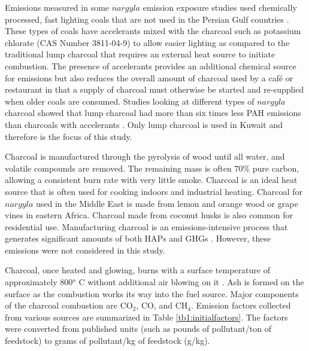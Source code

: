Emissions measured in some $nargyla$ emission exposure studies used chemically processed, fast lighting coals that are not used in the Persian Gulf countries \citep{Daher2010, Shihadeh2005}.  These types of coals have accelerants mixed with the charcoal such as potassium chlorate (CAS Number 3811-04-9) \citep{MIC2012} to allow easier lighting as compared to the traditional lump charcoal that requires an external heat source to initiate combustion.  The presence of accelerants provides an additional chemical source for emissions but also reduces the overall amount of charcoal used by a caf\'e or restaurant in that a supply of charcoal must otherwise be started and re-supplied when older coals are consumed. Studies looking at different types of $nargyla$ charcoal showed that lump charcoal had more than six times less PAH emissions than charcoals with accelerants \citep{Sepetdjian2010}.  Only lump charcoal is used in Kuwait and therefore is the focus of this study.

Charcoal is manufactured through the pyrolysis of wood until all water, and volatile compounds are removed.  The remaining mass is often 70\% pure carbon, allowing a consistent burn rate with very little smoke. Charcoal is an ideal heat source that is often used for cooking indoors and industrial heating.  Charcoal for $nargyla$ used in the Middle East is made from lemon and orange wood or grape vines in eastern Africa.  Charcoal made from coconut husks is also common for residential use.  Manufacturing charcoal is an emissions-intensive process that generates significant amounts of both HAPs and GHGs \citep{Lacaux1994}.  However, these emissions were not considered in this study.

Charcoal, once heated and glowing, burns with a surface temperature of approximately 800$^{o}$ C without additional air blowing on it \citep{Evans1977}.  Ash is formed on the surface as the combustion works its way into the fuel source. Major components of the charcoal combustion are CO$_{2}$, CO, and CH$_{4}$.  Emission factors collected from various sources are summarized in Table \ref{tb1:initialfactors}.  The factors were converted from published units (such as pounds of pollutant/ton of feedstock) to grams of pollutant/kg of feedstock (g/kg).


